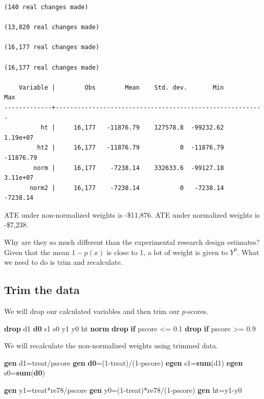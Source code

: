 \documentclass[
]{book}
\newenvironment{Shaded}{\begin{snugshade}}{\end{snugshade}}
\newcommand{\FunctionTok}[1]{\textcolor[rgb]{0.13,0.29,0.53}{\textbf{#1}}}
\newcommand{\KeywordTok}[1]{\textcolor[rgb]{0.13,0.29,0.53}{\textbf{#1}}}
\newcommand{\NormalTok}[1]{#1}
\begin{document}
\begin{verbatim}
(140 real changes made)

(13,820 real changes made)

(16,177 real changes made)

(16,177 real changes made)

    Variable |        Obs        Mean    Std. dev.       Min        Max
-------------+---------------------------------------------------------
          ht |     16,177   -11876.79    127578.8  -99232.62   1.19e+07
         ht2 |     16,177   -11876.79           0  -11876.79  -11876.79
        norm |     16,177    -7238.14    332633.6  -99127.18   3.11e+07
       norm2 |     16,177    -7238.14           0   -7238.14   -7238.14
\end{verbatim}

ATE under non-normalized weights is -\$11,876.
ATE under normalized weights is -\$7,238.

Why are they so much different than the experimental research design estimates? Given that the mean \(1-p(x)\) is close to 1, a lot of weight is given to \(Y^0\). What we need to do is trim and recalculate.

\subsection{Trim the data}\label{trim-the-data-1}

We will drop our calculated variables and then trim our \(p\)-scores.

\begin{Shaded}
\begin{Highlighting}[]
\KeywordTok{drop}\NormalTok{ d1 }\KeywordTok{d0}\NormalTok{ s1 s0 y1 y0 ht }\FunctionTok{norm}
\KeywordTok{drop} \KeywordTok{if}\NormalTok{ pscore \textless{}= 0.1 }
\KeywordTok{drop} \KeywordTok{if}\NormalTok{ pscore \textgreater{}= 0.9}
\end{Highlighting}
\end{Shaded}

We will recalculate the non-normalized weights using trimmed data.

\begin{Shaded}
\begin{Highlighting}[]
\KeywordTok{gen}\NormalTok{ d1=treat/pscore}
\KeywordTok{gen} \KeywordTok{d0}\NormalTok{=(1{-}treat)/(1{-}pscore)}
\KeywordTok{egen}\NormalTok{ s1=}\KeywordTok{sum}\NormalTok{(d1)}
\KeywordTok{egen}\NormalTok{ s0=}\KeywordTok{sum}\NormalTok{(}\KeywordTok{d0}\NormalTok{)}

\KeywordTok{gen}\NormalTok{ y1=treat*re78/pscore}
\KeywordTok{gen}\NormalTok{ y0=(1{-}treat)*re78/(1{-}pscore)}
\KeywordTok{gen}\NormalTok{ ht=y1{-}y0}
\end{Highlighting}
\end{Shaded}
\end{document}
